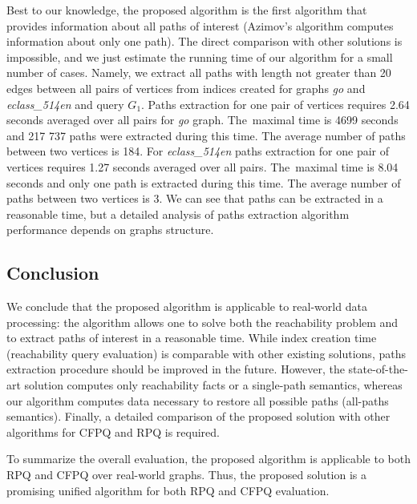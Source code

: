 Best to our knowledge, the proposed algorithm is the first algorithm that provides information about all paths of interest (Azimov's algorithm computes information about only one path).
The direct comparison with other solutions is impossible, and we just estimate the running time of our algorithm for a small number of cases.
Namely, we extract all paths with length not greater than 20 edges between all pairs of vertices from indices created for graphs \textit{go} and \textit{eclass\_514en} and query $G_1$.
Paths extraction for one pair of vertices requires 2.64 seconds averaged over all pairs for \textit{go} graph. The~maximal time is 4699 seconds and 217 737 paths were extracted during this time. The average number of paths between two vertices is 184.
For \textit{eclass\_514en} paths extraction for one pair of vertices requires 1.27 seconds averaged over all pairs. The~maximal time is 8.04 seconds and only one path is extracted during this time. The average number of paths between two vertices is 3.
We can see that paths can be extracted in a reasonable time, but a detailed analysis of paths extraction algorithm performance depends on graphs structure.


\subsection{Conclusion}

We conclude that the proposed algorithm is applicable to real-world data processing: the algorithm allows one to solve both the reachability problem and to extract paths of interest in a reasonable time.
While index creation time (reachability query evaluation) is comparable with other existing solutions, paths extraction procedure should be improved in the future. However, the state-of-the-art solution computes only reachability facts or a single-path semantics, whereas our algorithm computes data necessary to restore all possible paths (all-paths semantics).
Finally, a detailed comparison of the proposed solution with other algorithms for CFPQ and RPQ is required.

To summarize the overall evaluation, the proposed algorithm is applicable to both RPQ and CFPQ over real-world graphs.
Thus, the proposed solution is a promising unified algorithm for both RPQ and CFPQ evaluation.
